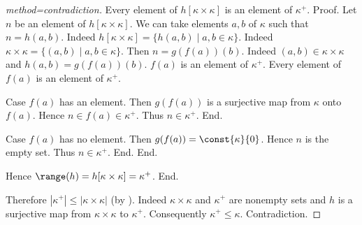 \documentclass{article}
\begin{document}
\begin{forthel}
\begin{proof}[method=contradiction]
        Every element of $h[\kappa \times \kappa]$ is an element of $\kappa^+$. \newline
        Proof.
          Let $n$ be an element of $h[\kappa \times \kappa]$.
          We can take elements $a, b$ of $\kappa$ such that $n = h(a,b)$.
          Indeed $h[\kappa \times \kappa] = \{h(a,b) \mid a,b \in \kappa\}$.
          Indeed $\kappa \times \kappa = \{(a,b) \mid a,b \in \kappa\}$.
          Then $n = g(f(a))(b)$.
          Indeed $(a,b) \in \kappa \times \kappa$ and $h(a,b) = g(f(a))(b)$.
          $f(a)$ is an element of $\kappa^+$.
          Every element of $f(a)$ is an element of $\kappa^+$.

          Case $f(a)$ has an element.
            Then $g(f(a))$ is a surjective map from $\kappa$ onto $f(a)$.
            Hence $n \in f(a) \in \kappa^+$.
            Thus $n \in \kappa^+$.
          End.

          Case $f(a)$ has no element.
            Then $g(f(a)) = \const{\kappa}{0}$.
            Hence $n$ is the empty set.
            Thus $n \in \kappa^+$.
          End.
        End.

        Hence $\range(h) = h[\kappa \times \kappa] = \kappa^+$.
      End.

      Therefore $|\kappa^+| \leq |\kappa \times \kappa|$ (by ).
      Indeed $\kappa \times \kappa$ and $\kappa^+$ are nonempty sets and $h$ is a surjective map from $\kappa \times \kappa$ to $\kappa^+$.
      Consequently $\kappa^+ \leq \kappa$.
      Contradiction.
    \end{proof}
  \end{forthel}

  \printbibliography
\end{document}
